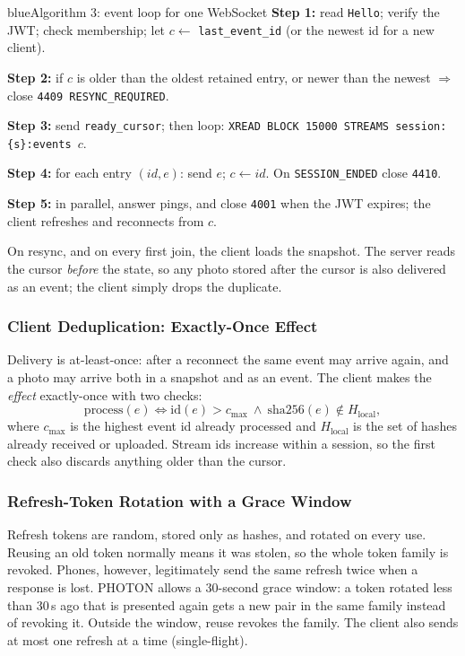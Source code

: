 \begin{pbox}{blue}{Algorithm 3: event loop for one WebSocket}
\textbf{Step 1:} read \texttt{Hello}; verify the JWT; check membership; let $c \leftarrow$ \texttt{last\_event\_id} (or the newest id for a new client).\par
\textbf{Step 2:} if $c$ is older than the oldest retained entry, or newer than the newest $\Rightarrow$ close \texttt{4409 RESYNC\_REQUIRED}.\par
\textbf{Step 3:} send \texttt{ready\_cursor}; then loop: \texttt{XREAD BLOCK 15000 STREAMS session:\{s\}:events $c$}.\par
\textbf{Step 4:} for each entry $(id, e)$: send $e$; $c \leftarrow id$. On \texttt{SESSION\_ENDED} close \texttt{4410}.\par
\textbf{Step 5:} in parallel, answer pings, and close \texttt{4001} when the JWT expires; the client refreshes and reconnects from $c$.
\end{pbox}

On resync, and on every first join, the client loads the snapshot. The server reads the cursor \emph{before} the state, so any photo stored after the cursor is also delivered as an event; the client simply drops the duplicate.

\subsubsection{Client Deduplication: Exactly-Once Effect}

Delivery is at-least-once: after a reconnect the same event may arrive again, and a photo may arrive both in a snapshot and as an event. The client makes the \emph{effect} exactly-once with two checks:
\begin{equation}\label{eq:dedupe}
  \text{process}(e) \iff \text{id}(e) > c_\text{max} \ \wedge\ \text{sha256}(e) \notin H_\text{local},
\end{equation}
where $c_\text{max}$ is the highest event id already processed and $H_\text{local}$ is the set of hashes already received or uploaded. Stream ids increase within a session, so the first check also discards anything older than the cursor.

\subsubsection{Refresh-Token Rotation with a Grace Window}

Refresh tokens are random, stored only as hashes, and rotated on every use. Reusing an old token normally means it was stolen, so the whole token family is revoked. Phones, however, legitimately send the same refresh twice when a response is lost. PHOTON allows a 30-second grace window: a token rotated less than 30\,s ago that is presented again gets a new pair in the same family instead of revoking it. Outside the window, reuse revokes the family. The client also sends at most one refresh at a time (single-flight).


